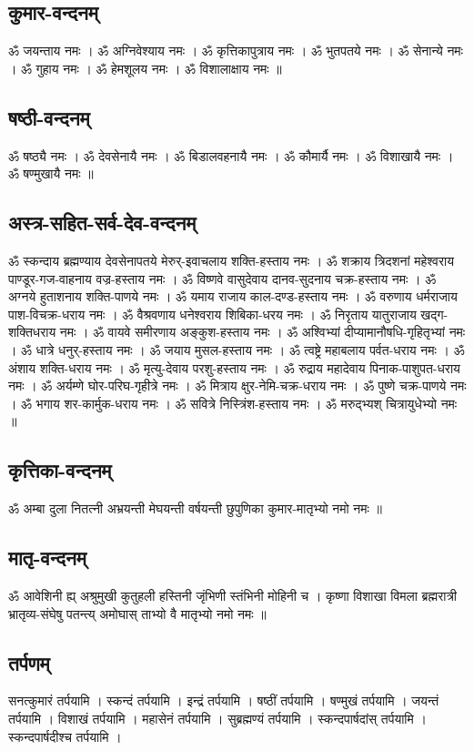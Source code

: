 \documentclass[13pt]{article}
\begin{document}
\subsection{{\skt कुमार-वन्दनम् }}
{\skt ॐ जयन्ताय नमः । ॐ अग्निवेश्याय नमः । ॐ कृत्तिकापुत्राय नमः । ॐ भुतपतये नमः । ॐ सेनान्ये नमः । ॐ गुहाय नमः । ॐ हेमशूलय नमः । ॐ विशालाक्षाय नमः ॥
}
\subsection{{\skt षष्ठी-वन्दनम् }}
{\skt ॐ षष्ठ्यै नमः । ॐ देवसेनायै नमः । ॐ बिडालवहनायै नमः । ॐ कौमार्यै नमः । ॐ विशाखायै नमः । ॐ षण्मुखायै नमः ॥  
}
\subsection{{\skt अस्त्र-सहित-सर्व-देव-वन्दनम् }}
{\skt ॐ स्कन्दाय ब्रह्मण्याय देवसेनापतये मेरुर्-इवाचलाय शक्ति-हस्ताय नमः । ॐ शक्राय त्रिदशनां महेश्वराय पाण्डूर-गज-वाहनाय वज्र-हस्ताय नमः । ॐ विष्णवे वासुदेवाय दानव-सुदनाय चक्र-हस्ताय नमः । ॐ अग्नये हुताशनाय शक्ति-पाणये नमः । ॐ यमाय राजाय काल-दण्ड-हस्ताय नमः । ॐ वरुणाय धर्मराजाय पाश-विचक्र-धराय नमः । ॐ वैश्रवणाय धनेश्वराय शिबिका-धरय नमः । ॐ निरृताय यातुराजाय खद्ग-शक्तिधराय नमः । ॐ वायवे समीरणाय अङ्कुश-हस्ताय नमः । ॐ अश्विभ्यां दीप्यामानौषधि-गृहितृभ्यां नमः । ॐ धात्रे धनुर्-हस्ताय  नमः । ॐ जयाय मुसल-हस्ताय  नमः । ॐ त्वष्ट्रे महाबलाय पर्वत-धराय नमः । ॐ अंशाय शक्ति-धराय  नमः । ॐ मृत्यु-देवाय परशु-हस्ताय  नमः । ॐ रुद्राय महादेवाय पिनाक-पाशुपत-धराय  नमः । ॐ अर्यम्णे घोर-परिघ-गृहीत्रे नमः । ॐ मित्राय क्षुर-नेमि-चक्र-धराय  नमः । ॐ पुष्णे चक्र-पाणये  नमः । ॐ भगाय शर-कार्मुक-धराय  नमः । ॐ सवित्रे निस्त्रिंश-हस्ताय नमः । ॐ मरुद्भ्यश् चित्रायुधेभ्यो  नमः ॥ 
}
\subsection{{\skt कृत्तिका-वन्दनम् }}
{\skt ॐ अम्बा दुला नितत्नी अभ्रयन्ती मेघयन्ती वर्षयन्ती छुपुणिका कुमार-मातृभ्यो नमो नमः ॥
}
\subsection{{\skt मातृ-वन्दनम् }}
{\skt ॐ आवेशिनी ह्य् अश्रुमुखी कुतुहली हस्तिनी जृंभिणी स्तंभिनी मोहिनी च । कृष्णा विशाखा विमला ब्रह्मरात्री भ्रातृव्य-संघेषु पतन्त्य् अमोघास् ताभ्यो वै मातृभ्यो नमो नमः ॥ 
}
\subsection{{\skt तर्पणम् }}
{\skt सनत्कुमारं तर्पयामि । स्कन्दं तर्पयामि । इन्द्रं तर्पयामि । षष्ठीं तर्पयामि । षण्मुखं तर्पयामि । जयन्तं तर्पयामि । विशाखं तर्पयामि । महासेनं तर्पयामि । सुब्रह्मण्यं तर्पयामि । स्कन्दपार्षदांस् तर्पयामि । स्कन्दपार्षदीश्च तर्पयामि ।
 }
\end{document}
